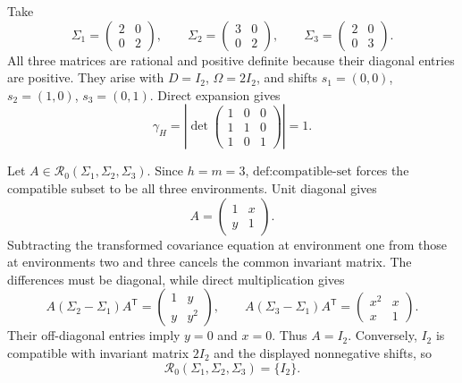 Take
\[
\Sigma_1=\begin{pmatrix}2&0\\0&2\end{pmatrix},\qquad
\Sigma_2=\begin{pmatrix}3&0\\0&2\end{pmatrix},\qquad
\Sigma_3=\begin{pmatrix}2&0\\0&3\end{pmatrix}.
\]
All three matrices are rational and positive definite because their diagonal entries are positive. They arise with \(D=I_2\), \(\Omega=2I_2\), and shifts \(s_1=(0,0)\), \(s_2=(1,0)\), \(s_3=(0,1)\). Direct expansion gives
\[
\gamma_H=
\left|\det\begin{pmatrix}1&0&0\\1&1&0\\1&0&1\end{pmatrix}\right|=1.
\]

Let \(A\in\mathcal R_0(\Sigma_1,\Sigma_2,\Sigma_3)\). Since \(h=m=3\), \(\text{def:compatible-set}\) forces the compatible subset to be all three environments. Unit diagonal gives
\[
A=\begin{pmatrix}1&x\\y&1\end{pmatrix}.
\]
Subtracting the transformed covariance equation at environment one from those at environments two and three cancels the common invariant matrix. The differences must be diagonal, while direct multiplication gives
\[
A(\Sigma_2-\Sigma_1)A^{\mathsf T}
=\begin{pmatrix}1&y\\y&y^2\end{pmatrix},
\qquad
A(\Sigma_3-\Sigma_1)A^{\mathsf T}
=\begin{pmatrix}x^2&x\\x&1\end{pmatrix}.
\]
Their off-diagonal entries imply \(y=0\) and \(x=0\). Thus \(A=I_2\). Conversely, \(I_2\) is compatible with invariant matrix \(2I_2\) and the displayed nonnegative shifts, so
\[
\mathcal R_0(\Sigma_1,\Sigma_2,\Sigma_3)=\{I_2\}.
\]

